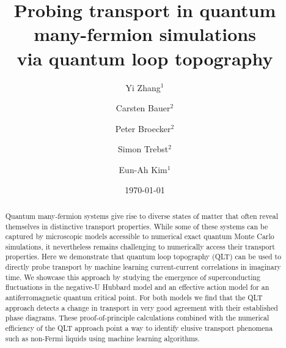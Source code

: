 \documentclass[amsmath,amssymb, aps, prl, twocolumn]{revtex4-1}
\begin{document}
\title{ Probing transport in quantum many-fermion simulations\\ via quantum loop topography}

\author{Yi Zhang$^1$}
\author{Carsten Bauer$^2$}
\author{Peter Broecker$^2$} 
\author{Simon Trebst$^2$}
\author{Eun-Ah Kim$^1$}

%

\date{\today}%

\begin{abstract}
Quantum many-fermion systems give rise to diverse states of matter that often reveal themselves in distinctive transport properties. While some of these systems can be captured by microscopic models accessible to numerical exact quantum Monte Carlo simulations, it nevertheless remains challenging to  numerically access their transport properties. 
Here we demonstrate that quantum loop topography (QLT) can be used to directly probe transport by machine learning current-current correlations in imaginary time.
We showcase this approach by studying the emergence of superconducting fluctuations in the negative-U Hubbard model and an effective action model for an antiferromagnetic quantum critical point. For both models
we find that the QLT approach detects a change in transport in very good agreement with their established phase diagrams.
These proof-of-principle calculations combined with the numerical efficiency of the QLT approach point a way to identify elusive
transport phenomena such as non-Fermi liquids using machine learning
algorithms.

\end{abstract}
\end{document}
